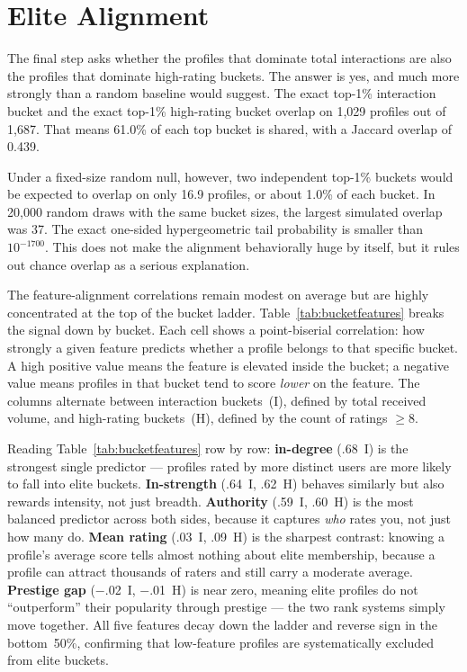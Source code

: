 \documentclass[10pt,twocolumn]{article}
\begin{document}
\section{Elite Alignment}
The final step asks whether the profiles that dominate total interactions are also the profiles that dominate high-rating buckets. The answer is yes, and much more strongly than a random baseline would suggest. The exact top-1\% interaction bucket and the exact top-1\% high-rating bucket overlap on 1,029 profiles out of 1,687. That means 61.0\% of each top bucket is shared, with a Jaccard overlap of 0.439.

Under a fixed-size random null, however, two independent top-1\% buckets would be expected to overlap on only 16.9 profiles, or about 1.0\% of each bucket. In 20,000 random draws with the same bucket sizes, the largest simulated overlap was 37. The exact one-sided hypergeometric tail probability is smaller than $10^{-1700}$. This does not make the alignment behaviorally huge by itself, but it rules out chance overlap as a serious explanation.

The feature-alignment correlations remain modest on average but are highly concentrated at the top of the bucket ladder. Table~\ref{tab:bucketfeatures} breaks the signal down by bucket. Each cell shows a point-biserial correlation: how strongly a given feature predicts whether a profile belongs to that specific bucket. A high positive value means the feature is elevated inside the bucket; a negative value means profiles in that bucket tend to score \emph{lower} on the feature. The columns alternate between interaction buckets~(I), defined by total received volume, and high-rating buckets~(H), defined by the count of ratings $\geq8$.

Reading Table~\ref{tab:bucketfeatures} row by row: \textbf{in-degree} (.68~I) is the strongest single predictor --- profiles rated by more distinct users are more likely to fall into elite buckets. \textbf{In-strength} (.64~I, .62~H) behaves similarly but also rewards intensity, not just breadth. \textbf{Authority} (.59~I, .60~H) is the most balanced predictor across both sides, because it captures \emph{who} rates you, not just how many do. \textbf{Mean rating} (.03~I, .09~H) is the sharpest contrast: knowing a profile's average score tells almost nothing about elite membership, because a profile can attract thousands of raters and still carry a moderate average. \textbf{Prestige gap} ($-$.02~I, $-$.01~H) is near zero, meaning elite profiles do not ``outperform'' their popularity through prestige --- the two rank systems simply move together. All five features decay down the ladder and reverse sign in the bottom~50\%, confirming that low-feature profiles are systematically excluded from elite buckets.
\end{document}
